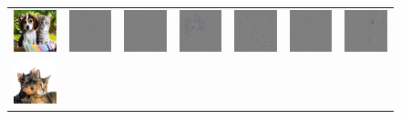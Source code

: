 \begin{figure}
\begin{center}
\begin{tabular}{ccccccc}
\includegraphics[width=0.14\linewidth,height=0.115\linewidth]{figs/examples/googlenet/oxford/dog-cat2} &
\includegraphics[width=0.14\linewidth,height=0.115\linewidth]{figs/examples/googlenet/oxford/dog-cat2_diff_163} &
\includegraphics[width=0.14\linewidth,height=0.115\linewidth]{figs/examples/googlenet/deconv/dog-cat2_diff_163} &
\includegraphics[width=0.14\linewidth,height=0.115\linewidth]{figs/examples/googlenet/soft/dog-cat2_diff_163} &
\includegraphics[width=0.14\linewidth,height=0.115\linewidth]{figs/examples/googlenet/oxford/dog-cat2_diff_286} &
\includegraphics[width=0.14\linewidth,height=0.115\linewidth]{figs/examples/googlenet/deconv/dog-cat2_diff_286} &
\includegraphics[width=0.14\linewidth,height=0.115\linewidth]{figs/examples/googlenet/soft/dog-cat2_diff_286} \\
\vspace{-2.5pt}
\includegraphics[width=0.14\linewidth,height=0.115\linewidth]{figs/examples/googlenet/oxford/dog-cat3} &

\end{tabular}
\end{center}
\end{figure}
